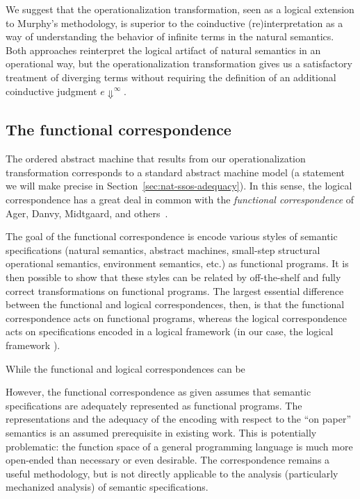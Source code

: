 We suggest that the operationalization transformation, seen as a
logical extension to Murphy's methodology, is superior to the
coinductive (re)interpretation as a way of understanding the behavior
of infinite terms in the natural semantics. Both approaches
reinterpret the logical artifact of natural semantics in an
operational way, but the operationalization transformation gives us a
satisfactory treatment of diverging terms without requiring the
definition of an additional coinductive judgment $e
\Downarrow^\infty$.

\subsection{The functional correspondence}

The ordered abstract machine that results from our operationalization
transformation corresponds to a standard abstract machine model (a
statement we will make precise in
Section~\ref{sec:nat-ssos-adequacy}). In this sense, the logical
correspondence has a great deal in common with the {\it functional
  correspondence} of Ager, Danvy, Midtgaard, and
others~\cite{ager03functional,ager04functional,ager05functional,
  danvy08defunctionalized,danvy12interderiving}. 

The goal of the functional correspondence is encode various styles of
semantic specifications (natural semantics, abstract machines,
small-step structural operational semantics, environment semantics,
etc.) as functional programs. It is then possible to show that these
styles can be related by off-the-shelf and fully correct
transformations on functional programs. The largest essential difference
between the functional and logical correspondences, then, is that
the functional correspondence acts on functional programs, whereas
the logical correspondence acts on specifications encoded in a logical
framework (in our case, the logical framework \sls). 

While the functional and logical correspondences can be 


However, the functional correspondence as given assumes that 
semantic specifications are adequately represented as functional
programs. 
%
The
representations and the adequacy of the encoding with respect to the ``on paper''
semantics is an assumed prerequisite in existing work. 
This is potentially
problematic: the function space of a general programming language
is much more open-ended than necessary or even desirable. The correspondence
remains a useful methodology, but is not 
directly applicable to the analysis 
(particularly mechanized analysis) of semantic specifications.


